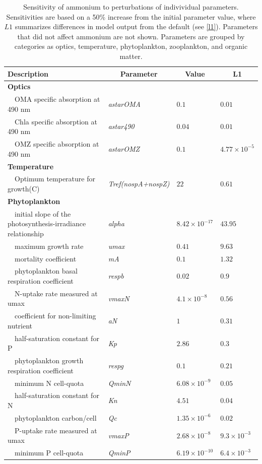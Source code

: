 \documentclass[letterpaper,12pt,oneside]{article}\usepackage[]{graphicx}\usepackage[]{color}
\begin{document}
\begin{table}[!tbp]
{\footnotesize
\caption{Sensitivity of ammonium to perturbations of indivividual parameters.  Sensitivities are based on a 50\% increase from the initial parameter value, where $L1$ summarizes differences in model output from the default (see \cref{l1}).  Parameters that did not affect ammonium are not shown.  Parameters are grouped by categories as optics, temperature, phytoplankton, zooplankton, and organic matter.\label{tab:nh4sens}} 
\begin{center}
\begin{tabular}{llll}
\hline\hline
\multicolumn{1}{l}{Description}&\multicolumn{1}{c}{Parameter}&\multicolumn{1}{c}{Value}&\multicolumn{1}{c}{L1}\tabularnewline
\hline
{\bfseries Optics}&&&\tabularnewline
~~OMA specific absorption at 490 nm&\textit{astarOMA}&$0.1$&$0.01$\tabularnewline
~~Chla specific absorption at 490 nm&\textit{astar490}&$0.04$&$0.01$\tabularnewline
~~OMZ specific absorption at 490 nm&\textit{astarOMZ}&$0.1$&$4.77\times 10^{-5}$\tabularnewline
\hline
{\bfseries Temperature}&&&\tabularnewline
~~Optimum temperature for growth(C)&\textit{Tref(nospA+nospZ)}&$22$&$0.61$\tabularnewline
\hline
{\bfseries Phytoplankton}&&&\tabularnewline
~~initial slope of the photosynthesis-irradiance relationship&\textit{alpha}&$8.42\times 10^{-17}$&$43.95$\tabularnewline
~~maximum growth rate&\textit{umax}&$0.41$&$9.63$\tabularnewline
~~mortality coefficient&\textit{mA}&$0.1$&$1.32$\tabularnewline
~~phytoplankton basal respiration coefficient&\textit{respb}&$0.02$&$0.9$\tabularnewline
~~N-uptake rate measured at umax&\textit{vmaxN}&$4.1\times 10^{-8}$&$0.56$\tabularnewline
~~coefficient for non-limiting nutrient&\textit{aN}&$1$&$0.31$\tabularnewline
~~half-saturation constant for P&\textit{Kp}&$2.86$&$0.3$\tabularnewline
~~phytoplankton growth respiration coefficient&\textit{respg}&$0.1$&$0.21$\tabularnewline
~~minimum N cell-quota&\textit{QminN}&$6.08\times 10^{-9}$&$0.05$\tabularnewline
~~half-saturation constant for N&\textit{Kn}&$4.51$&$0.04$\tabularnewline
~~phytoplankton carbon/cell&\textit{Qc}&$1.35\times 10^{-6}$&$0.02$\tabularnewline
~~P-uptake rate measured at umax&\textit{vmaxP}&$2.68\times 10^{-8}$&$9.3\times 10^{-3}$\tabularnewline
~~minimum P cell-quota&\textit{QminP}&$6.19\times 10^{-10}$&$6.4\times 10^{-3}$\tabularnewline

\end{tabular}
\end{center}}
\end{table}
\end{document}
